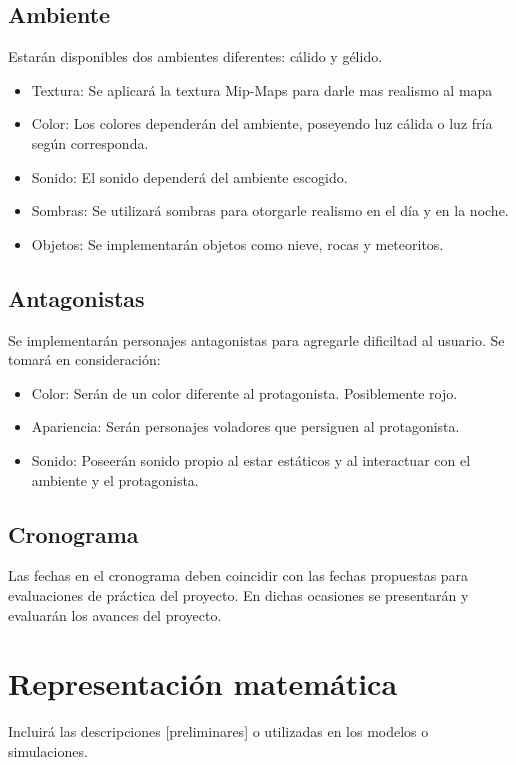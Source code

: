 \documentclass[a4paper]{article}
\begin{document}
\subsection{Ambiente}
Estarán disponibles dos ambientes diferentes: cálido y gélido.
\begin{itemize}
	\item Textura: Se aplicará la textura Mip-Maps para darle mas realismo al mapa
	\item Color: Los colores dependerán del ambiente, poseyendo luz cálida o luz fría según corresponda.
	\item Sonido: El sonido dependerá del ambiente escogido.
	\item Sombras: Se utilizará sombras para otorgarle realismo en el día y en la noche.
	\item Objetos: Se implementarán objetos como nieve, rocas y meteoritos.
	
\end{itemize}

\subsection{Antagonistas}
Se implementarán personajes antagonistas para agregarle dificiltad al usuario. Se tomará en consideración:
\begin{itemize}
	\item Color: Serán de un color diferente al protagonista. Posiblemente rojo.
	\item Apariencia: Serán personajes voladores que persiguen al protagonista.
	\item Sonido: Poseerán sonido propio al estar estáticos y al interactuar con el ambiente y el protagonista.
	
\end{itemize}

\subsection{Cronograma}

Las fechas en el cronograma deben coincidir con las fechas propuestas para evaluaciones de práctica del proyecto. En dichas ocasiones se presentarán y evaluarán los avances del proyecto.

\section{Representación matemática}
Incluirá las descripciones [preliminares] o utilizadas en los
modelos o simulaciones.
\end{document}
